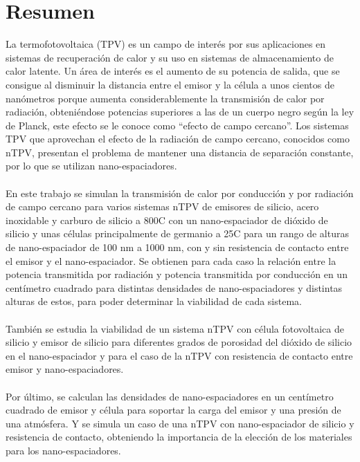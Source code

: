 \chapter{Resumen}

La termofotovoltaica (TPV) es un campo de interés por sus aplicaciones en sistemas de recuperación de calor y su uso en sistemas de almacenamiento de calor latente. Un área de interés es el aumento de su potencia de salida, que se consigue al  disminuir la distancia entre el emisor y la célula a unos cientos de nanómetros porque aumenta considerablemente la transmisión de calor por radiación, obteniéndose potencias superiores a las de un cuerpo negro según la ley de Planck, este efecto se le conoce como ``efecto de campo cercano''. Los sistemas TPV que aprovechan el efecto de la radiación de campo cercano, conocidos como nTPV, presentan el problema de mantener una distancia de separación constante, por lo que se utilizan nano-espaciadores.\\\\
En este trabajo se simulan la transmisión de calor por conducción y por radiación de campo cercano para varios sistemas nTPV de emisores de silicio, acero inoxidable y carburo de silicio a 800\textdegree C con un nano-espaciador de dióxido de silicio y unas células principalmente de germanio a 25\textdegree C para un rango de alturas de nano-espaciador de 100 nm a 1000 nm, con y sin resistencia de contacto entre el emisor y el nano-espaciador. Se obtienen para cada caso la relación entre la potencia transmitida por radiación y potencia transmitida por conducción en un centímetro cuadrado para distintas densidades de nano-espaciadores y distintas alturas de estos, para poder determinar la viabilidad de cada sistema.\\\\
También se estudia la viabilidad de un sistema nTPV con célula fotovoltaica de silicio y emisor de silicio para diferentes grados de porosidad del dióxido de silicio en el nano-espaciador y para el caso de la nTPV con resistencia de contacto entre emisor y nano-espaciadores.\\\\
Por último, se calculan las densidades de nano-espaciadores en un centímetro cuadrado de emisor y célula para soportar la carga del emisor y una presión de una atmósfera. Y se simula un caso de una nTPV con nano-espaciador de silicio y resistencia de contacto, obteniendo la importancia de la elección de los materiales para los nano-espaciadores.


